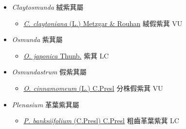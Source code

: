 
  \begin{itemize}
 \item[] \textit{Claytosmunda} 絨紫萁屬
                    
  \begin{itemize}
        \item[] \href{http://www.theplantlist.org/tpl1.1/search?q=Claytosmunda+claytoniana}{\textit{C. claytoniana} (L.) Metzgar \& Rouhan}     絨假紫萁 VU
  \end{itemize}
 \item[] \textit{Osmunda} 紫萁屬
                    
  \begin{itemize}
        \item[] \href{http://www.theplantlist.org/tpl1.1/search?q=Osmunda+japonica}{\textit{O. japonica} Thunb.}   紫萁 LC
  \end{itemize}
 \item[] \textit{Osmundastrum} 假紫萁屬
                    
  \begin{itemize}
        \item[] \href{http://www.theplantlist.org/tpl1.1/search?q=Osmundastrum+cinnamomeum}{\textit{O. cinnamomeum} (L.) C.Presl}     分株假紫萁 VU
  \end{itemize}
 \item[] \textit{Plenasium} 革葉紫萁屬
                    
  \begin{itemize}
        \item[] \href{http://www.theplantlist.org/tpl1.1/search?q=Plenasium+banksiifolium}{\textit{P. banksiifolium} (C.Presl) C.Presl}     粗齒革葉紫萁 LC
  \end{itemize}
  \end{itemize}
